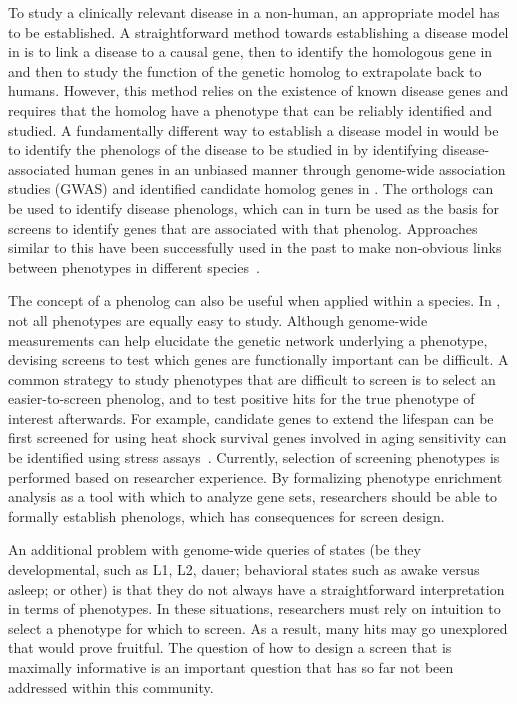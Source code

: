 To study a clinically relevant disease in a non-human, an appropriate
model has to be established. A straightforward method towards establishing a
disease model in
\cel{} is to link a disease to a causal gene, then to identify the homologous
gene in \cel{} and then to study the function of the genetic homolog to
extrapolate back to humans. However, this method relies on the existence of
known disease genes and requires that the homolog have a phenotype that can be
reliably identified and studied. A fundamentally different way to establish a
disease model in \cel{} would be to identify the phenologs of the disease to be
studied in \cel{} by identifying disease-associated human genes in an unbiased
manner through genome-wide association studies (GWAS) and identified candidate
homolog genes in \cel{}. The orthologs can be used to identify \cel{} disease
phenologs, which can in turn be used as the basis for screens to identify
genes that are associated with that phenolog. Approaches similar to this have
been successfully used in the past to make non-obvious links between phenotypes
in different species~\citep{McGary2010}.

The concept of a phenolog can also be useful when applied within a species.
In \cel{}, not all phenotypes are equally easy to study. Although genome-wide
measurements can help elucidate the genetic network underlying a phenotype,
devising screens to test which genes are functionally important can be difficult.
A common strategy to study phenotypes that are difficult to screen is to
select an easier-to-screen phenolog, and to test positive hits for the true
phenotype of interest afterwards. For example, candidate genes to extend the \cel{}
lifespan can be first screened for using heat shock survival
genes involved in \cel{} aging
sensitivity can be identified using stress assays~\citep{Kim2007a,Mehta2009}.
Currently, selection of screening phenotypes is performed based on researcher
experience. By formalizing phenotype enrichment analysis as a tool with which to
analyze gene sets, researchers should be able to formally establish phenologs,
which has consequences for screen design.

An additional problem with genome-wide
queries of \cel{} states (be they developmental, such as
L1, L2, dauer; behavioral states such as awake versus asleep; or other) is that
they do not
always have a straightforward interpretation in terms of phenotypes. In these
situations, researchers must rely on intuition to select a phenotype for which to
screen. As a result, many hits may go unexplored that would prove fruitful. The
question of how to design a screen that is maximally informative is an important
question that has so far not been addressed within this community.


